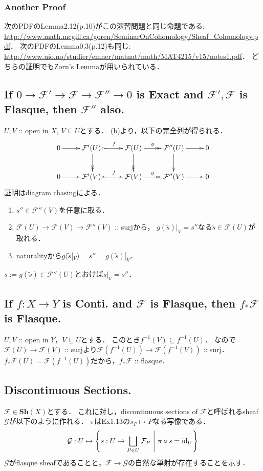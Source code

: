 \documentclass[a4paper]{jsarticle}
\newcommand{\shF}{\mathcal{F}}
\newcommand{\shG}{\mathcal{G}}
\newcommand{\Sh}{\mathbf{Sh}}
\begin{document}
    \subsubsection{Another Proof}
    次のPDFのLemma2.12(p.10)がこの演習問題と同じ命題である: 
    \url{http://www.math.mcgill.ca/goren/SeminarOnCohomology/Sheaf_Cohomology.pdf}．
    次のPDFのLemma0.3(p.12)も同じ:
    \url{http://www.uio.no/studier/emner/matnat/math/MAT4215/v15/notes1.pdf}．
    どちらの証明でもZorn's Lemmaが用いられている．

    \subsection{If $0 \to \shF' \to \shF \to \shF'' \to 0$ is Exact and $\shF', \shF$ is Flasque, then $\shF''$ also.}
    $U,V$ :: open in $X$, $V \subseteq U$とする．
    (b)より，以下の完全列が得られる．
    \[
    \xymatrix
    {
    0 \ar[r]& \shF'(U)~ \ar@{>->}[r]^-{f} \ar@{->>}[d]& \shF(U) \ar@{->>}[r]^-{g} \ar@{->>}[d]& \shF''(U) \ar[r] \ar[d]& 0 \\
    0 \ar[r]& \shF'(V)~ \ar@{>->}[r]^-{f}& \shF(V) \ar@{->>}[r]^-{g}& \shF''(V) \ar[r]& 0
    }
    \]
    証明はdiagram chasingによる．
    \begin{enumerate}[(1)]
    \setlength{\itemindent}{2em}
        \item   $s'' \in \shF''(V)$を任意に取る．
        \item   $\shF(U) \to \shF(V) \to \shF''(V)$ :: surjから，
                $g(\tilde{s})|_V=s''$なる$\tilde{s} \in \shF(U)$が取れる．
        \item   naturalityから$g(\tilde{s}|_V)=s''=g(\tilde{s})|_V$．
    \end{enumerate}
    $s:=g(\tilde{s}) \in \shF''(U)$とおけば$s|_V=s''$．

    \subsection{If $f: X \to Y$ is Conti. and $\shF$ is Flasque, then $f_* \shF$ is Flasque.}
    $U,V$ :: open in $Y$，$V \subseteq U$とする．
    このとき$f^{-1}(V) \subseteq f^{-1}(U)$．
    なので$\shF(U) \to \shF(V)$ :: surjより$\shF(f^{-1}(U)) \to \shF(f^{-1}(V))$ :: surj．
    $f_* \shF(U)=\shF(f^{-1}(U))$だから，$f_* \shF$ :: flasque．

    \subsection{Discontinuous Sections.}
    $\shF \in \Sh(X)$とする．
    これに対し，discontinuous sections of $\shF$と呼ばれるsheaf $\shG$が以下のように作れる．
    $\pi$はEx1.13の$s_P \mapsto P$なる写像である．
    \[ \shG: U \mapsto \left\{ s:U \to \bigsqcup_{P \in U} \shF_P ~\middle|~ \pi \circ s=\id{U} \right\} \]
    $\shG$がflasque sheafであることと，$\shF \to \shG$の自然な単射が存在することを示す．
    
\end{document}
